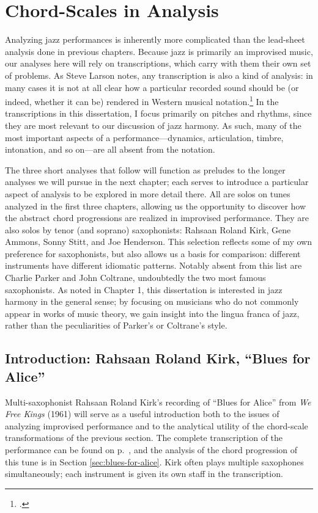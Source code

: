 \section{Chord-Scales in Analysis}
\label{sec:chord-scale-analysis}

Analyzing jazz performances is inherently more complicated than the
lead-sheet analysis done in previous chapters. Because jazz is primarily an
improvised music, our analyses here will rely on transcriptions, which carry
with them their own set of problems. As Steve Larson notes, any
transcription is also a kind of analysis: in many cases it is not at all clear
how a particular recorded sound should be (or indeed, whether it can be)
rendered in Western musical notation.\footcite[1--2]{larson:2009} In the
transcriptions in this dissertation, I focus primarily on pitches and rhythms,
since they are most relevant to our discussion of jazz harmony. As such, many
of the most important aspects of a performance---dynamics, articulation,
timbre, intonation, and so on---are all absent from the notation.

The three short analyses that follow will function as preludes to the longer
analyses we will pursue in the next chapter; each serves to introduce a
particular aspect of analysis to be explored in more detail there. All are
solos on tunes analyzed in the first three chapters, allowing us the
opportunity to discover how the abstract chord progressions are realized in
improvised performance. They are also solos by tenor (and soprano)
saxophonists: Rahsaan Roland Kirk, Gene Ammons, Sonny Stitt, and Joe
Henderson. This selection reflects some of my own preference for saxophonists,
but also allows us a basis for comparison: different instruments have
different idiomatic patterns. Notably absent from this list are Charlie Parker
and John Coltrane, undoubtedly the two most famous saxophonists. As noted in
Chapter 1, this dissertation is interested in jazz harmony in the general
sense; by focusing on musicians who do not commonly appear in works of music
theory, we gain insight into the lingua franca of jazz, rather than the
peculiarities of Parker's or Coltrane's style.

\subsection{Introduction: Rahsaan Roland Kirk, “Blues for Alice”}
\label{subsec:kirk-blues-for-alice}

Multi-saxophonist Rahsaan Roland Kirk's recording of ``Blues for Alice'' from
\emph{We Free Kings} (1961) will serve as a useful introduction both to the
issues of analyzing improvised performance and to the analytical utility of
the chord-scale transformations of the previous section. The complete
transcription of the performance can be found on
p.~\pageref{transcription:blues-for-alice}, and the analysis of the chord
progression of this tune is in Section \ref{sec:blues-for-alice}. Kirk often
plays multiple saxophones simultaneously; each instrument is given its own
staff in the transcription.

